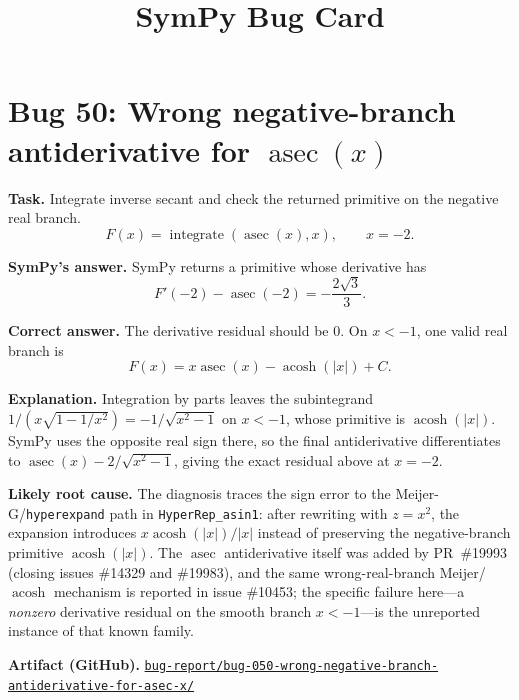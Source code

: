 \documentclass[11pt]{article}
\title{SymPy Bug Card}
\date{}
\newcommand{\SymPy}{SymPy}
\newcommand{\artifactrepo}{https://github.com/TODO-org/TODO-repo}
\newcommand{\bugbundle}[1]{\href{\artifactrepo/tree/main/bug-report/#1}{\nolinkurl{bug-report/#1/}}}
\begin{document}
\author{}
\maketitle

\section*{Bug 50: Wrong negative-branch antiderivative for \texorpdfstring{$\operatorname{asec}(x)$}{asec(x)}}

\begin{counterexamplebox}
\textbf{Task.} Integrate inverse secant and check the returned primitive on the negative real branch.
\[
F(x)=\operatorname{integrate}(\operatorname{asec}(x),x),\qquad x=-2.
\]

\medskip
\textbf{SymPy's answer.} \SymPy{} returns a primitive whose derivative has
\[
F'(-2)-\operatorname{asec}(-2)=-\frac{2\sqrt{3}}{3}.
\]

\medskip
\textbf{Correct answer.} The derivative residual should be \(0\).  On \(x<-1\), one valid real branch is
\[
F(x)=x\operatorname{asec}(x)-\operatorname{acosh}(|x|)+C.
\]

\medskip
\textbf{Explanation.} Integration by parts leaves the subintegrand
\(1/(x\sqrt{1-1/x^2})=-1/\sqrt{x^2-1}\) on \(x<-1\), whose primitive is
\(\operatorname{acosh}(|x|)\).  SymPy uses the opposite real sign there, so the
final antiderivative differentiates to
\(\operatorname{asec}(x)-2/\sqrt{x^2-1}\), giving the exact residual above at
\(x=-2\).

\medskip
\textbf{Likely root cause.} The diagnosis traces the sign error to the
Meijer-G/\texttt{hyperexpand} path in \texttt{HyperRep\_asin1}: after rewriting
with \(z=x^2\), the expansion introduces
\(x\operatorname{acosh}(|x|)/|x|\) instead of preserving the negative-branch
primitive \(\operatorname{acosh}(|x|)\).  The \(\operatorname{asec}\)
antiderivative itself was added by PR~\#19993 (closing issues \#14329 and
\#19983), and the same wrong-real-branch Meijer/\(\operatorname{acosh}\)
mechanism is reported in issue \#10453; the specific failure here---a
\emph{nonzero} derivative residual on the smooth branch \(x<-1\)---is the
unreported instance of that known family.

\medskip
\textbf{Artifact (GitHub).} \bugbundle{bug-050-wrong-negative-branch-antiderivative-for-asec-x}
\end{counterexamplebox}
\end{document}
